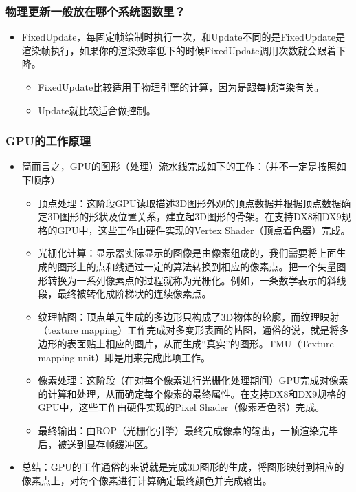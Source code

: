 \documentclass[9pt, b5paper]{article}
\begin{document}
\subsubsection{物理更新一般放在哪个系统函数里？}
\label{sec:orgda27ffa}
\begin{itemize}
\item FixedUpdate，每固定帧绘制时执行一次，和Update不同的是FixedUpdate是渲染帧执行，如果你的渲染效率低下的时候FixedUpdate调用次数就会跟着下降。
\begin{itemize}
\item FixedUpdate比较适用于物理引擎的计算，因为是跟每帧渲染有关。
\item Update就比较适合做控制。
\end{itemize}
\end{itemize}

\subsubsection{GPU的工作原理}
\label{sec:orgd751855}
\begin{itemize}
\item 简而言之，GPU的图形（处理）流水线完成如下的工作：（并不一定是按照如下顺序）
\begin{itemize}
\item 顶点处理：这阶段GPU读取描述3D图形外观的顶点数据并根据顶点数据确定3D图形的形状及位置关系，建立起3D图形的骨架。在支持DX8和DX9规格的GPU中，这些工作由硬件实现的Vertex Shader（顶点着色器）完成。
\item 光栅化计算：显示器实际显示的图像是由像素组成的，我们需要将上面生成的图形上的点和线通过一定的算法转换到相应的像素点。把一个矢量图形转换为一系列像素点的过程就称为光栅化。例如，一条数学表示的斜线段，最终被转化成阶梯状的连续像素点。
\item 纹理帖图：顶点单元生成的多边形只构成了3D物体的轮廓，而纹理映射（texture mapping）工作完成对多变形表面的帖图，通俗的说，就是将多边形的表面贴上相应的图片，从而生成“真实”的图形。TMU（Texture mapping unit）即是用来完成此项工作。
\item 像素处理：这阶段（在对每个像素进行光栅化处理期间）GPU完成对像素的计算和处理，从而确定每个像素的最终属性。在支持DX8和DX9规格的GPU中，这些工作由硬件实现的Pixel Shader（像素着色器）完成。
\item 最终输出：由ROP（光栅化引擎）最终完成像素的输出，一帧渲染完毕后，被送到显存帧缓冲区。
\end{itemize}
\item 总结：GPU的工作通俗的来说就是完成3D图形的生成，将图形映射到相应的像素点上，对每个像素进行计算确定最终颜色并完成输出。
\end{itemize}
\end{document}
